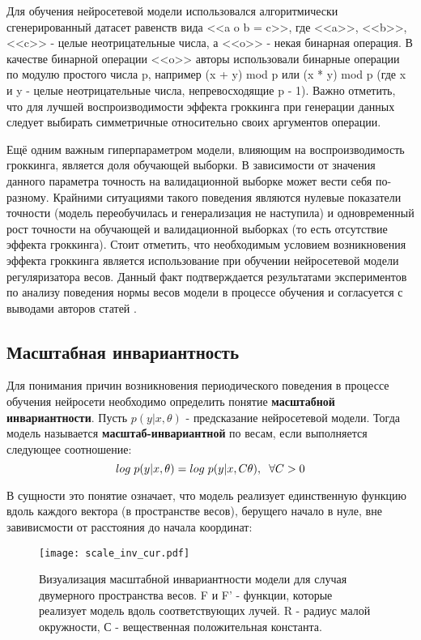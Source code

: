 \documentclass{article}
\begin{document}
\par Для обучения нейросетевой модели использовался алгоритмически сгенерированный датасет равенств вида <<a o b = c>>, где <<a>>, <<b>>, <<c>> - целые неотрицательные числа, а <<o>> - некая бинарная операция. 
В качестве бинарной операции <<o>> авторы  использовали бинарные операции по модулю простого числа p, например (x + y) mod p или (x * y) mod p (где x и y - целые неотрицательные числа, непревосходящие p - 1). Важно отметить, что для лучшей воспроизводимости эффекта гроккинга при генерации данных следует выбирать симметричные относительно своих аргументов операции. 
\par Ещё одним важным гиперпараметром модели, влияющим на воспроизводимость гроккинга, является доля обучающей выборки. В зависимости от значения данного параметра точность на валидационной выборке может вести себя по-разному. Крайними ситуациями такого поведения являются нулевые показатели точности (модель переобучилась и генерализация не наступила) и одновременный рост точности на обучающей и валидационной выборках (то есть отсутствие эффекта гроккинга).
 Стоит отметить, что необходимым условием возникновения эффекта гроккинга является использование при обучении нейросетевой модели регуляризатора весов. Данный факт подтверждается результатами экспериментов по анализу поведения нормы весов модели в процессе обучения и согласуется с выводами авторов статей \cite{grokking_start, omnigrok}.
\subsection{Масштабная инвариантность}
Для понимания причин возникновения периодического поведения в процессе обучения нейросети необходимо определить понятие \textbf{масштабной инвариантности}. Пусть $p(y|x, \theta)$ - предсказание нейросетевой модели. Тогда модель называется 
\textbf{масштаб-инвариантной} по весам, если выполняется следующее соотношение:
$$log \hspace{1mm} p(y|x, \theta) = log \hspace{1mm} p(y|x, C\theta), \hspace{2mm}\forall C > 0$$
\par В сущности это понятие означает, что модель реализует единственную функцию вдоль каждого вектора (в пространстве весов), берущего начало в нуле, вне завивисмости от расстояния до начала координат:
\begin{figure}[h]
\centering
\texttt{[image: scale\_inv\_cur.pdf]}
\caption{Визуализация масштабной инвариантности модели для случая двумерного пространства весов. F и F' - функции, которые реализует модель вдоль соответствующих лучей. R - радиус малой окружности, С - вещественная положительная константа.}
\label{fig:fig4}
\end{figure}
\end{document}
